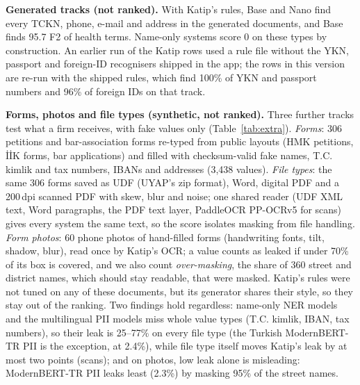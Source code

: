 \documentclass[10pt,twocolumn]{article}
\begin{document}
\textbf{Generated tracks (not ranked).} With Katip's rules, Base and Nano find every TCKN, phone, e-mail and
address in the generated documents, and Base finds 95.7 F2 of health terms. Name-only systems score 0 on these
types by construction. An earlier run of the Katip rows used a rule file without the YKN, passport and
foreign-ID recognisers shipped in the app; the rows in this version are re-run with the shipped rules, which find
100\% of YKN and passport numbers and 96\% of foreign IDs on that track.

\textbf{Forms, photos and file types (synthetic, not ranked).} Three further tracks test what a firm receives,
with fake values only (Table~\ref{tab:extra}). \emph{Forms}: 306 petitions and bar-association forms re-typed from
public layouts (HMK petitions, \.{I}\.{I}K forms, bar applications) and filled with checksum-valid fake names,
T.C. kimlik and tax numbers, IBANs and addresses (3,438 values). \emph{File types}: the same 306 forms saved as UDF
(UYAP's zip format), Word, digital PDF and a 200\,dpi scanned PDF with skew, blur and noise; one shared reader
(UDF XML text, Word paragraphs, the PDF text layer, PaddleOCR PP-OCRv5 for scans) gives every system the same
text, so the score isolates masking from file handling. \emph{Form photos}: 60 phone photos of hand-filled forms
(handwriting fonts, tilt, shadow, blur), read once by Katip's OCR; a value counts as leaked if under 70\% of its
box is covered, and we also count \emph{over-masking}, the share of 360 street and district names, which should stay
readable, that were masked. Katip's rules were not tuned on any of these documents, but its generator shares
their style, so they stay out of the ranking. Two findings hold regardless: name-only NER models and the multilingual PII models miss whole
value types (T.C. kimlik, IBAN, tax numbers), so their leak is 25--77\% on every file type (the Turkish
ModernBERT-TR PII is the exception, at 2.4\%), while file type itself
moves Katip's leak by at most two points (scans); and on photos, low leak alone is misleading: ModernBERT-TR PII
leaks least (2.3\%) by masking 95\% of the street names.
\end{document}
